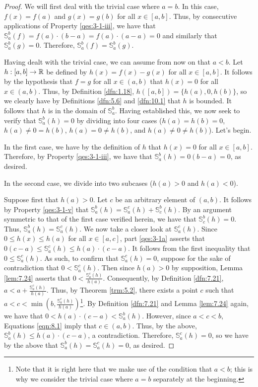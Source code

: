 \documentclass[../main.tex]{subfiles}
\begin{document}
\begin{enumerate}
\begin{enumerate}[ref={(\alph*)}]
\begin{proof}
            We will first deal with the trivial case where $a=b$. In this case, $f(x)=f(a)$ and $g(x)=g(b)$ for all $x\in[a,b]$. Thus, by consecutive applications of Property \ref{qes:3-1-iii}, we have that $\mathbb{S}_a^b(f)=f(a)\cdot(b-a)=f(a)\cdot(a-a)=0$ and similarly that $\mathbb{S}_a^b(g)=0$. Therefore, $\mathbb{S}_a^b(f)=\mathbb{S}_a^b(g)$.\par\bigskip
            Having dealt with the trivial case, we can assume from now on that $a<b$. Let $h:[a,b]\to\mathbb{R}$ be defined by $h(x)=f(x)-g(x)$ for all $x\in[a,b]$. It follows by the hypothesis that $f=g$ for all $x\in(a,b)$ that $h(x)=0$ for all $x\in(a,b)$. Thus, by Definition \ref{dfn:1.18}, $h([a,b])=\{h(a),0,h(b)\}$, so we clearly have by Definitions \ref{dfn:5.6} and \ref{dfn:10.1} that $h$ is bounded. It follows that $h$ is in the domain of $\mathbb{S}_a^b$. Having established this, we now seek to verify that $\mathbb{S}_a^b(h)=0$ by dividing into four cases ($h(a)=h(b)=0$, $h(a)\neq 0=h(b)$, $h(a)=0\neq h(b)$, and $h(a)\neq 0\neq h(b)$). Let's begin.\par\medskip
            In the first case, we have by the definition of $h$ that $h(x)=0$ for all $x\in[a,b]$. Therefore, by Property \ref{qes:3-1-iii}, we have that $\mathbb{S}_a^b(h)=0(b-a)=0$, as desired.\par\smallskip
            In the second case, we divide into two subcases ($h(a)>0$ and $h(a)<0$).\par
            Suppose first that $h(a)>0$. Let $c$ be an arbitrary element of $(a,b)$. It follows by Property \ref{qes:3-1-v} that $\mathbb{S}_a^b(h)=\mathbb{S}_a^c(h)+\mathbb{S}_c^b(h)$. By an argument symmetric to that of the first case verified herein, we have that $\mathbb{S}_c^b(h)=0$. Thus, $\mathbb{S}_a^b(h)=\mathbb{S}_a^c(h)$. We now take a closer look at $\mathbb{S}_a^c(h)$. Since $0\leq h(x)\leq h(a)$ for all $x\in[a,c]$, part \ref{qes:3-1a} asserts that $0(c-a)\leq\mathbb{S}_a^c(h)\leq h(a)\cdot(c-a)$. It follows from the first inequality that $0\leq\mathbb{S}_a^c(h)$. As such, to confirm that $\mathbb{S}_a^c(h)=0$, suppose for the sake of contradiction that $0<\mathbb{S}_a^c(h)$. Then since $h(a)>0$ by supposition, Lemma \ref{lem:7.24} asserts that $0<\frac{\mathbb{S}_a^c(h)}{h(a)}$. Consequently, by Definition \ref{dfn:7.21}, $a<a+\frac{\mathbb{S}_a^c(h)}{h(a)}$. Thus, by Theorem \ref{trm:5.2}, there exists a point $c$ such that $a<c<\min(b,\frac{\mathbb{S}_a^c(h)}{h(a)})$\footnote{Note that it is right here that we make use of the condition that $a<b$; this is why we consider the trivial case where $a=b$ separately at the beginning.}. By Definition \ref{dfn:7.21} and Lemma \ref{lem:7.24} again, we have that $0<h(a)\cdot(c-a)<\mathbb{S}_a^b(h)$. However, since $a<c<b$, Equations \ref{eqn:8.1} imply that $c\in(a,b)$. Thus, by the above, $\mathbb{S}_a^b(h)\leq h(a)\cdot(c-a)$, a contradiction. Therefore, $\mathbb{S}_a^c(h)=0$, so we have by the above that $\mathbb{S}_a^b(h)=\mathbb{S}_a^c(h)=0$, as desired.\par

\end{proof}
\end{enumerate}
\end{enumerate}
\end{document}
